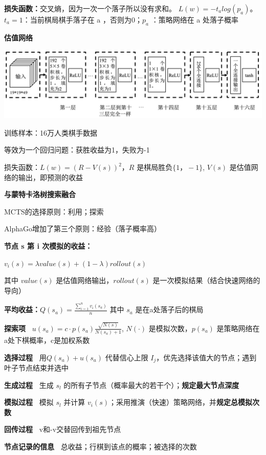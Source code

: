 \documentclass[b4paper, 10pt]{ctexart}
\makeatletter
\newenvironment{figurehere}
{\def\@captype{figure}}
{}
\makeatother
\begin{document}
\begin{multicols}{3}
\textbf{损失函数：}交叉熵，因为一次一个落子所以没有求和。
$L(w) = -t_alog(p_a)$。$t_a=1$：当前棋局棋手落子在 a ，否则为0；$p_a$ ：策略网络在 a 处落子概率

\textbf{估值网络\ }

\begin{figurehere}
    \centering    \includegraphics[width=0.95\linewidth]{figs/AlphaGo-value.png}
    \vskip -7pt%
    \label{fig:AlphaGo-value}
\end{figurehere}

训练样本：16万人类棋手数据

等效为一个回归问题：获胜收益为1，失败为-1

损失函数：$L(w)=(R-V(s))^2$，$R$ 是棋局胜负$\{1，-1\}$, $V(s)$ 是估值网络的输出，即预测的收益

\textbf{与蒙特卡洛树搜索融合\ }

MCTS的选择原则：利用；探索

AlphaGo增加了第三个原则：经验（落子概率高）

\textbf{节点 s 第 i 次模拟的收益：}

$v_i(s) = \lambda value(s) + (1-\lambda)rollout(s)$

其中 $value(s)$ 是估值网络输出，$rollout(s)$ 是一次模拟结果（结合快速网络的导向）

\textbf{平均收益：}$Q(s_a) = \frac{\sum_{i=1}^nv_i(s_a)}{n}$
其中 $s_a$ 是在a处落子后的棋局

\textbf{探索项\ } $u(s_a) = c\cdot p(s_a)\frac{\sqrt{N(s)}}{N(s_a)+1}$,
$N(\cdot)$ 是模拟次数，$p(s_a)$ 是策略网络在a处下棋概率，c是加权系数

\textbf{选择过程\ } 用$Q(s_a)+u(s_a)$ 代替信心上限 $I_j$，优先选择该值大的节点；遇到叶子节点结束并选中

\textbf{生成过程\ } 生成 $s_l$ 的所有子节点（概率最大的若干个）；\textbf{规定最大节点深度}

\textbf{模拟过程\ } 模拟 $s_l$ 并计算 $v_i(s)$；采用推演（快速）策略网络，并\textbf{规定总模拟次数}

\textbf{回传过程\ } v和-v交替回传到祖先节点

\textbf{节点记录的信息\ } 总收益；行棋到该点的概率；被选择的次数


\end{multicols}
\end{document}
